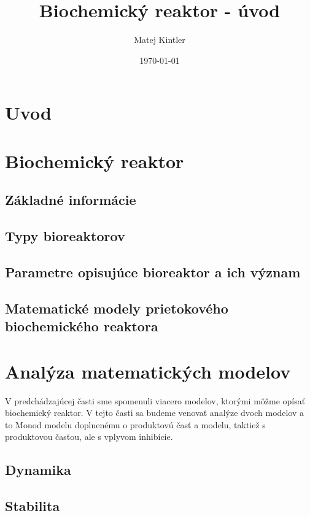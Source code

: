\documentclass[fleqn]{article}
\title{Biochemický reaktor - úvod}
\author{Matej Kintler}
\date{\today}
\begin{document}
	
\maketitle
\newpage

\tableofcontents
\newpage

\section{Uvod}

\newpage

\section{Biochemický reaktor}
\subsection{Základné informácie}


\subsection{Typy bioreaktorov}


\subsection{Parametre opisujúce bioreaktor a ich význam}


\subsection{Matematické modely prietokového biochemického reaktora}

\newpage

\section{Analýza matematických modelov}
V predchádzajúcej časti sme spomenuli viacero modelov, ktorými môžme opísať biochemický reaktor. V tejto časti sa budeme venovať analýze dvoch modelov a to Monod modelu doplnenému o produktovú časť a modelu, taktiež s produktovou časťou, ale s vplyvom inhibície.

\subsection{Dynamika}


\subsection{Stabilita}

\newpage
\end{document}

